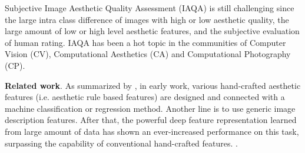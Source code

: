\documentclass[letterpaper]{article} %
\begin{document}
%

Subjective Image Aesthetic Quality Assessment (IAQA) is still challenging \cite{MaiCVPR2016} since the large intra class difference of images with high or low aesthetic quality, the large amount of low or high level aesthetic features, and the subjective evaluation of human rating. IAQA has been a hot topic in the communities of Computer Vision (CV), Computational Aesthetics (CA) and Computational Photography (CP).

\textbf{Related work}. As summarized by \cite{DengSPM2017}, in early work, various hand-crafted aesthetic features (i.e. aesthetic rule based features) are designed and connected with a machine classification or regression method. Another line is to use generic image description features. After that, the powerful deep feature representation learned from large amount of data has shown an ever-increased performance on this task, surpassing the capability of conventional hand-crafted features.
\cite{KarayevBMVC2014,LuMM2014,KaoICIP2015,LuICCV2015,LuTMM2015,DongNC2015,KaoSPIC2016,WangSP2016,MaiCVPR2016,KongECCV2016,JinWCSP2016,KaoTIP2017,MaCVPR2017}. 


\end{document}
